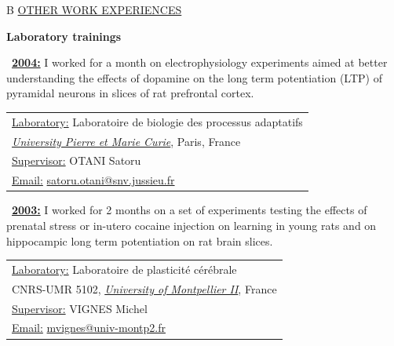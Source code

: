 \documentclass[a4paper,12pt,oneside]{letter}
\begin{document}
{\pagebreak

\begin{tabular}{B}
\underline{OTHER WORK EXPERIENCES}
\end{tabular}

\begin{center}
\Large\textbf{Laboratory trainings}
\end{center}

\begin{minipage}[c]{6.7cm}
\textbullet~\underline{\textbf{2004:}}	I worked for a month on electrophysiology experiments aimed at better understanding the effects of dopamine on the long term potentiation (LTP) of pyramidal neurons in slices of rat prefrontal cortex.
\end{minipage}
\hspace{3mm}
\begin{minipage}[c]{\textwidth}
\setlength\minrowclearance{0.1cm}
\setlength\arrayrulewidth{1.5pt}
\small
\begin{tabular}[c]{|l|}\hline
\underline{Laboratory:} Laboratoire de biologie des processus adaptatifs\\
\href{http://www.upmc.fr/}{\textit{University Pierre et Marie Curie}}, Paris, France\\
\underline{Supervisor:} OTANI Satoru\\
\underline{Email:} \href{mailto:satoru.otani@snv.jussieu.fr}{satoru.otani@snv.jussieu.fr}\\ \hline
\end{tabular}
\end{minipage}

\begin{minipage}[c]{7.7cm}
\textbullet~\underline{\textbf{2003:}}	I worked for 2 months on a set of experiments testing the effects of prenatal stress or in-utero cocaine injection on learning in young rats and on hippocampic long term potentiation on rat brain slices.
\end{minipage}
\hspace{3mm}
\begin{minipage}[c]{\textwidth}
\setlength\minrowclearance{0.1cm}
\setlength\arrayrulewidth{1.5pt}
\small
\begin{tabular}[c]{|l|}\hline
\underline{Laboratory:} Laboratoire de plasticité cérébrale\\
CNRS-UMR 5102, \href{http://www.univ-montp2.fr/}{\textit{University of Montpellier II}}, France\\
\underline{Supervisor:} VIGNES Michel\\
\underline{Email:} \href{mailto:mvignes@univ-montp2.fr}{mvignes@univ-montp2.fr}\\ \hline
\end{tabular}
\end{minipage}

}
\end{document}
